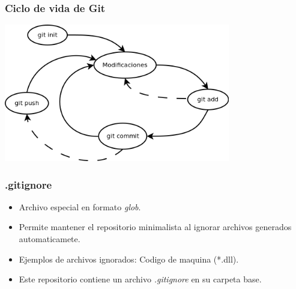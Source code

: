 \documentclass{beamer}
\begin{document}
\begin{frame}
\frametitle{Ciclo de vida de Git}
\begin{center}
\includegraphics[height=6cm]{gitcycle.png}
\end{center}
\end{frame}

\begin{frame}
\frametitle{.gitignore}
\begin{itemize}
    \item Archivo especial en formato \emph{glob}\cite{Gitignore}.
    \item Permite mantener el repositorio minimalista al ignorar archivos generados automaticamete.
    \item Ejemplos de archivos ignorados: Codigo de maquina (*.dll).
    \item Este repositorio contiene un archivo \emph{.gitignore} en su carpeta base.
\end{itemize}
\end{frame}

\begin{frame}


\end{frame}
\end{document}
